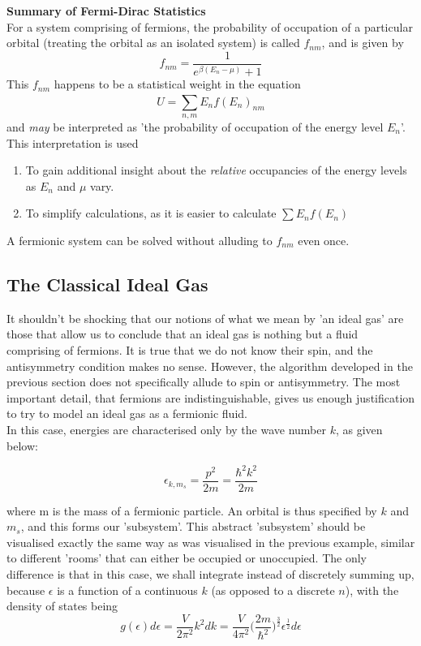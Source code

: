 \documentclass[oneside]{book}
\begin{document}
 \begin{mdframed}[style=exercise]
 \textbf{Summary of Fermi-Dirac Statistics}\\
For a system comprising of fermions, the probability of occupation of a particular orbital (treating the orbital as an isolated system) is called $f_{nm}$, and is given by
\[f_{nm} = \frac{1}{e^{\beta(E_{n} - \mu)}+ 1} \]
This $f_{nm}$ happens to be a statistical weight in the equation 
\[ U = \sum_{n,m}^{}E_{n}f(E_n)_{nm} \]
and \emph{may} be interpreted as 'the probability of occupation of the energy level $E_n$'. This interpretation is used
\begin{enumerate}
 \item To gain additional insight about the \emph{relative} occupancies of the energy levels as $E_n$ and $\mu$ vary. 
 \item To simplify calculations, as it is easier to calculate $\sum E_nf(E_n) $
 \end{enumerate}
 A fermionic system can be solved without alluding to $f_{nm}$ even once.

 \end{mdframed}
 
 
 
\subsection{The Classical Ideal Gas}
It shouldn't be shocking that our notions of what we mean by 'an ideal gas' are those that allow us to conclude that an ideal gas is nothing but a fluid comprising of fermions. It is true that we do not know their spin, and the antisymmetry condition makes no sense. However, the algorithm developed in the previous section does not specifically allude to spin or antisymmetry. The most important detail, that fermions are indistinguishable, gives us enough justification to try to model an ideal gas as a fermionic fluid. \\

In this case, energies are characterised only by the wave number $k$, as given below:

\[ \epsilon_{k,m_s} = \frac{p^2}{2m} =   \frac{\hbar^2k^2}{2m} \]

where m is the mass of a fermionic particle. An orbital is thus specified by $k$ and $m_s$, and this forms our 'subsystem'. This abstract 'subsystem' should be visualised exactly the same way as was visualised in the previous example, similar to different 'rooms' that can either be occupied or unoccupied. The only difference is that in this case, we shall integrate instead of discretely summing up, because $\epsilon$ is a function of a continuous $k$ (as opposed to a discrete $n$), with the density of states being
\[g(\epsilon)d\epsilon = \frac{V}{2\pi^2}k^2dk =  \frac{V}{4\pi^2}\Bigg(\frac{2m}{\hbar^2}\Bigg)^{\frac{3}{2}}\epsilon^{\frac{1}{2}}d\epsilon \]
\end{document}
